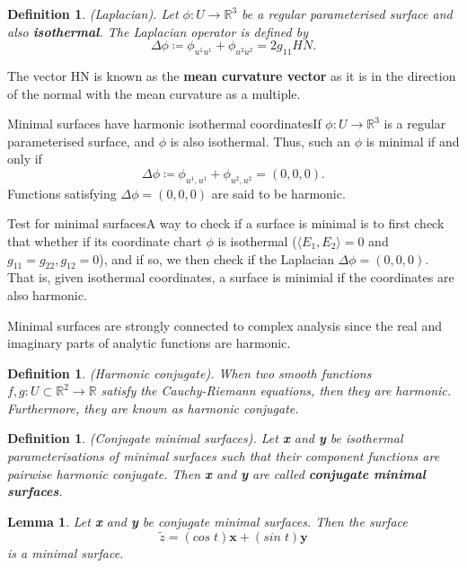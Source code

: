 \documentclass[twoside]{article}
\newtheorem{lemma}[theorem]{Lemma}
\newtheorem{definition}[theorem]{Definition}
\begin{document}
\begin{definition}(Laplacian). Let $\phi: U \rightarrow \mathbb{R}^3$ be a regular parameterised surface and also \textbf{isothermal}. The Laplacian operator is defined by 
$$
\Delta \phi \coloneqq \phi_{u^1u^1} + \phi_{u^2u^2} = 2g_{11}HN.
$$
\end{definition}

The vector HN is known as the \textbf{mean curvature vector} as it is in the direction of the normal with the mean curvature as a multiple. 


\begin{theorem_exam}{Minimal surfaces have harmonic isothermal coordinates}{}If $\phi:U \rightarrow \mathbb{R}^3$ is a regular parameterised surface, and $\phi$ is also isothermal.
Thus, such an $\phi$ is minimal if and only if 
$$
\Delta \phi \coloneqq \phi_{u^{1},u^{1}} + \phi_{u^{2},u^{2}} = (0,0,0).
$$
Functions satisfying $\Delta\phi = (0,0,0)$ are said to be harmonic.
\end{theorem_exam}
\begin{proposition_exam}{Test for minimal surfaces}{}A way to check if a surface is minimal is to first check that whether if its coordinate chart $\phi$ is isothermal ($\langle E_1, E_2 \rangle = 0$ and $g_{11} = g_{22}, g_{12} = 0$), and if so, we then check if the Laplacian $\Delta \phi = (0,0,0).$ That is, given isothermal coordinates, a surface is minimial if the coordinates are also harmonic.
\end{proposition_exam}

Minimal surfaces are strongly connected to complex analysis since the real and imaginary parts of analytic functions are harmonic.

\begin{definition}(Harmonic conjugate). When two smooth functions $f,g: U \subset \mathbb{R}^2 \rightarrow \mathbb{R}$ satisfy the Cauchy-Riemann equations, then they are harmonic. Furthermore, they are known as harmonic conjugate.
\end{definition}

\begin{definition}(Conjugate minimal surfaces). Let \textbf{x} and \textbf{y} be isothermal parameterisations of minimal surfaces such that their component functions are pairwise harmonic conjugate. Then \textbf{x} and \textbf{y} are called \textbf{conjugate minimal surfaces}.
\end{definition}

\begin{lemma}Let \textbf{x} and \textbf{y} be conjugate minimal surfaces. Then the surface 
$$
\tilde{z} = (cos\;t)\textbf{x} + (sin\;t)\textbf{y}
$$
is a minimal surface.
\end{lemma}
\end{document}
